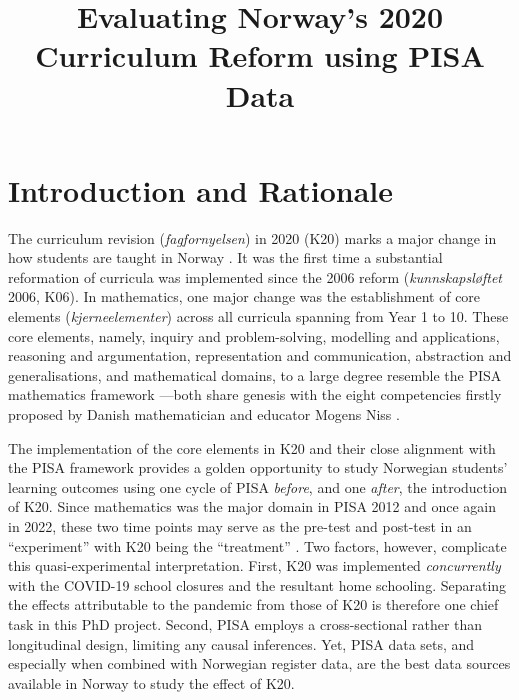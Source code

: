 \documentclass[
    a4paper,                %
    11pt,                   %
    stu,                    %
    donotrepeattitle,       %
    floatsintext,           %
    biblatex,               %
    colorlinks=true,        %
    linkcolor=red,          %
    anchorcolor=black,      %
    citecolor=blue,         %
    urlcolor=blue,          %
    bookmarks=true,         %
    bookmarksopen=false,    %
    bookmarksnumbered=true, %
    dvipsnames              %
]{apa7}
\title{Evaluating Norway's 2020 Curriculum Reform using PISA Data}
\begin{document}
\maketitle

\section{Introduction and Rationale}

The curriculum revision (\textit{fagfornyelsen}) in 2020 (K20) marks a major change in how students are taught in Norway \parencite{udir:2020}. It was the first time a substantial reformation of curricula was implemented since the 2006 reform (\textit{kunnskapsl{\o}ftet} 2006, K06). In mathematics, one major change was the establishment of core elements (\textit{kjerneelementer}) across all curricula spanning from Year 1 to 10. These core elements, namely, inquiry and problem-solving, modelling and applications, reasoning and argumentation, representation and communication, abstraction and generalisations, and mathematical domains, to a large degree resemble the PISA mathematics framework \parencite{oecd:2018}---both share genesis with the eight competencies firstly proposed by Danish mathematician and educator Mogens Niss \parencite{niss:2003,niss:2011,niss:2019}.

The implementation of the core elements in K20 and their close alignment with the PISA framework provides a golden opportunity to study Norwegian students' learning outcomes using one cycle of PISA \emph{before}, and one \emph{after}, the introduction of K20. Since mathematics was the major domain in PISA 2012 and once again in 2022, these two time points may serve as the pre-test and post-test in an ``experiment'' with K20 being the ``treatment'' \parencite{shadish:2002}. Two factors, however, complicate this quasi-experimental interpretation. First, K20 was implemented \emph{concurrently} with the COVID-19 school closures and the resultant home schooling. Separating the effects attributable to the pandemic from those of K20 is therefore one chief task in this PhD project. Second, PISA employs a cross-sectional rather than longitudinal design, limiting any causal inferences. Yet, PISA data sets, and especially when combined with Norwegian register data, are the best data sources available in Norway to study the effect of K20.
\end{document}
